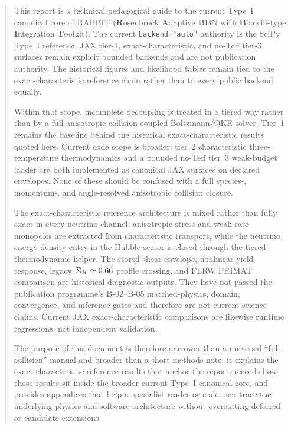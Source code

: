 \maketitle

\begin{abstract}
\noindent
This report is a technical pedagogical guide to the current Type~I canonical core of RABBIT (\textbf{R}osenbrock \textbf{A}daptive \textbf{BB}N with \textbf{B}ianchi-type \textbf{I}ntegration \textbf{T}oolkit).  The current \texttt{backend="auto"} authority is the SciPy Type~I reference.  JAX tier-1, exact-characteristic, and no-Teff tier-3 surfaces remain explicit bounded backends and are not publication authority.  The historical figures and likelihood tables remain tied to the exact-characteristic reference chain rather than to every public backend equally.

Within that scope, incomplete decoupling is treated in a tiered way rather than by a full anisotropic collision-coupled Boltzmann/QKE solver.  Tier~1 remains the baseline behind the historical exact-characteristic results quoted here.  Current code scope is broader: tier~2 characteristic three-temperature thermodynamics and a bounded no-Teff tier~3 weak-budget ladder are both implemented as canonical JAX surfaces on declared envelopes.  None of these should be confused with a full species-, momentum-, and angle-resolved anisotropic collision closure.

The exact-characteristic reference architecture is mixed rather than fully exact in every neutrino channel: anisotropic stress and weak-rate monopoles are extracted from characteristic transport, while the neutrino energy-density entry in the Hubble sector is closed through the tiered thermodynamic helper.  The stored shear envelope, nonlinear yield response, legacy $\SigH\simeq0.66$ profile crossing, and FLRW PRIMAT comparison are historical diagnostic outputs.  They have not passed the publication programme's B-02--B-05 matched-physics, domain, convergence, and inference gates and therefore are not current science claims.  Current JAX exact-characteristic comparisons are likewise runtime regressions, not independent validation.

The purpose of this document is therefore narrower than a universal ``full collision'' manual and broader than a short methods note: it explains the exact-characteristic reference results that anchor the report, records how those results sit inside the broader current Type~I canonical core, and provides appendices that help a specialist reader or code user trace the underlying physics and software architecture without overstating deferred or candidate extensions.
\end{abstract}

\tableofcontents
\newpage

